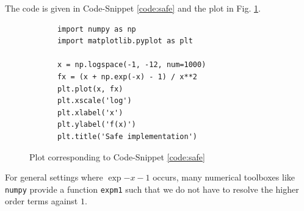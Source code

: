 \begin{solutionblock}
    The code is given in Code-Snippet \ref{code:safe} and the plot in Fig. \ref{fig:safe}.

    \begin{codebox}
        \begin{verbatim}
            import numpy as np
            import matplotlib.pyplot as plt

            x = np.logspace(-1, -12, num=1000)
            fx = (x + np.exp(-x) - 1) / x**2
            plt.plot(x, fx)
            plt.xscale('log')
            plt.xlabel('x')
            plt.ylabel('f(x)')
            plt.title('Safe implementation')
        \end{verbatim}
        \caption{Safe version of $f(x) = \frac{x + e^{-x} - 1}{x^2}$ for finite precision.}
        \label{code:safe}
    \end{codebox}

    \begin{figure}[!htb]
     \centering
     \hfill
     \caption{Plot corresponding to Code-Snippet \ref{code:safe}}
     \label{fig:safe}
    \end{figure}

    For general settings where $\exp{-x} - 1$ occurs, many numerical toolboxes like \texttt{numpy}
    provide a function \texttt{expm1} such that we do not have to resolve the higher order terms against $1$.
    
\end{solutionblock}